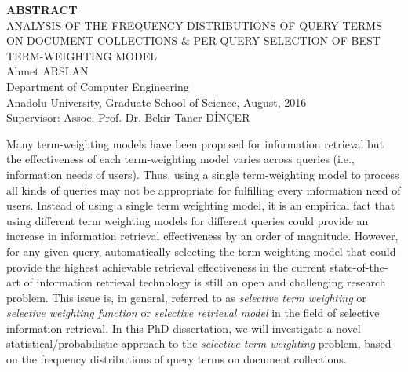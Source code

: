 %
%
%

\newpage
{}
\begin{spacing}{1.2}
\begin{center}
\textbf{ABSTRACT} \vspace{4mm}\\
ANALYSIS OF THE FREQUENCY DISTRIBUTIONS OF QUERY TERMS ON DOCUMENT COLLECTIONS \& PER-QUERY SELECTION OF BEST TERM-WEIGHTING MODEL\\
\vspace{4mm}
Ahmet ARSLAN
\vspace{4mm} \\
Department of Computer Engineering \\
Anadolu University, Graduate School of Science, August, 2016 \\
\vspace{4mm}
Supervisor: Assoc. Prof. Dr. Bekir Taner D\.{I}N\c{C}ER \\
\end{center}
\vspace*{-1mm}

Many term-weighting models have been proposed for information retrieval but the effectiveness of each term-weighting model varies across queries (i.e., information needs of users). 
Thus, using a single term-weighting model to process all kinds of queries may not be appropriate for fulfilling every information need of users.
Instead of using a single term weighting model, it is an empirical fact that using different term weighting models for different queries could provide an increase in information retrieval effectiveness by an order of magnitude.
However, for any given query, automatically selecting the term-weighting model that could provide the highest achievable retrieval effectiveness in the current state-of-the-art of information retrieval technology is still an open and challenging research problem.
This issue is, in general, referred to as \emph{selective term weighting} or \emph{selective weighting function} or \emph{selective retrieval model} in the field of selective information retrieval.
In this PhD dissertation, we will investigate a novel statistical/probabilistic approach to the \emph{selective term weighting} problem, based on the frequency distributions of query terms on document collections.


\end{spacing}
